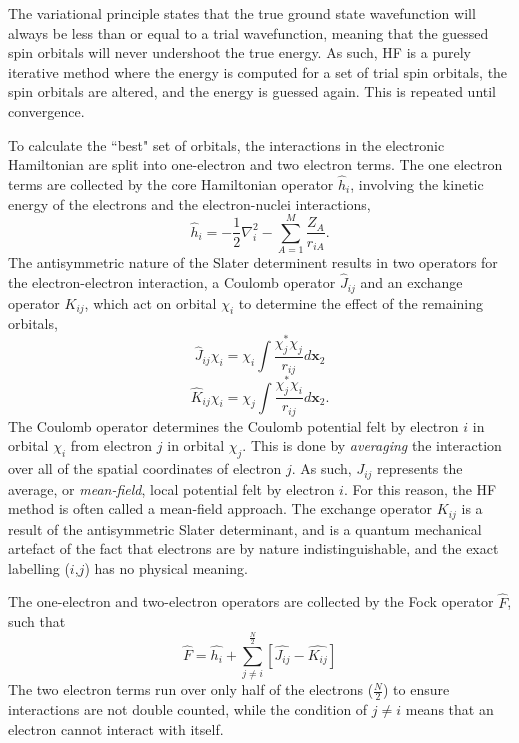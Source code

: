 The variational principle states that the true ground state wavefunction will always be less than or equal to a trial wavefunction, meaning that the guessed spin orbitals will never undershoot the true energy. As such, 
\ac{HF} is a purely iterative method where the energy is computed for a set of trial spin orbitals, the spin orbitals are altered, and the energy is guessed again. This is repeated until convergence. 

To calculate the ``best" set of orbitals, the interactions in the electronic Hamiltonian are split into one-electron and two electron terms. The one electron terms are collected by the core Hamiltonian operator $\hat{h}_{i}$, involving the kinetic energy of the electrons and the electron-nuclei interactions,
\begin{equation}
    \hat{h}_{i}=-\frac{1}{2}\nabla_{i}^{2}-\sum_{A=1}^{M}\frac{Z_{A}}{r_{iA}}.
\end{equation}
The antisymmetric nature of the Slater determinent results in two operators for the electron-electron interaction, a Coulomb operator $\hat{J}_{ij}$ and an exchange operator $K_{ij}$, which act on orbital $\chi_{i}$ to determine the effect of the remaining orbitals,
\begin{equation}
    \hat{J}_{ij}\chi_{i}=\chi_{i}\int{\frac{\chi^{\ast}_{j}\chi_{j}}{r_{ij}}d\bm{x}_{2}}
\end{equation}
\begin{equation}
    \hat{K}_{ij}\chi_{i}=\chi_{j}\int{\frac{\chi^{\ast}_{j}\chi_{i}}{r_{ij}}d\bm{x}_{2}}.
\end{equation}
The Coulomb operator determines the Coulomb potential felt by electron $i$ in orbital $\chi_{i}$ from electron $j$ in orbital $\chi_{j}$. This is done by \textit{averaging} the interaction over all of the spatial coordinates of electron $j$. As such, $J_{ij}$ represents the average, or \textit{mean-field}, local potential felt by electron $i$. For this reason, the \ac{HF} method is often called a mean-field approach. The exchange operator $K_{ij}$ is a result of the antisymmetric Slater determinant, and is a quantum mechanical artefact of the fact that electrons are by nature  indistinguishable, and the exact labelling ($i$,$j$) has no physical meaning. 

The one-electron and two-electron operators are collected by the Fock operator $\hat{F}$, such that
\begin{equation}
    \hat{F}=\hat{h_{i}}+\sum_{j\neq{}i}^{\frac{N}{2}}{[\hat{J_{ij}}-\hat{K_{ij}}]}
\end{equation}
The two electron terms run over only half of the electrons ($\frac{N}{2}$) to ensure interactions are not double counted, while the condition of $j\neq{}i$ means that an electron cannot interact with itself. 

